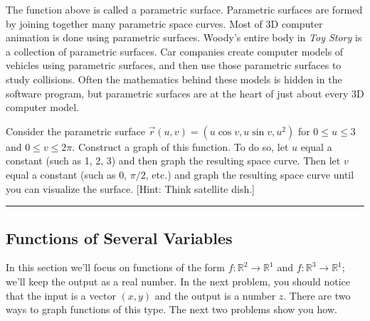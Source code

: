The function above is called a parametric surface.  Parametric surfaces are formed by joining together many parametric space curves. Most of 3D computer animation is done using parametric surfaces. Woody's entire body in {\it Toy Story} is a collection of parametric surfaces. Car companies create computer models of vehicles using parametric surfaces, and then use those parametric surfaces to study collisions. Often the mathematics behind these models is hidden in the software program, but parametric surfaces are at the heart of just about every 3D computer model.

\begin{problem}\label{second parametric surface example}%
% 
 Consider the parametric surface $\vec r(u,v)=(u\cos v, u\sin v, u^2)$ for $0\leq u\leq 3$ and $0\leq v\leq 2 \pi$.
 Construct a graph of this function. To do so, let $u$ equal a constant (such as 1, 2, 3) and then graph the resulting space curve.  Then let $v$ equal a constant (such as 0, $\pi/2$, etc.) and graph the resulting space curve until you can visualize the surface. [Hint: Think satellite dish.] 
\hrule\end{problem}


\subsection{Functions of Several Variables}

In this section we'll focus on functions of the form $f:\mathbb{R}^2\to\mathbb{R}^1$ and $f:\mathbb{R}^3\to\mathbb{R}^1$; we'll keep the output as a real number. In the next problem, you should notice that the input is a vector $(x,y)$ and the output is a number $z$. There are two ways to graph functions of this type.  The next two problems show you how. 

